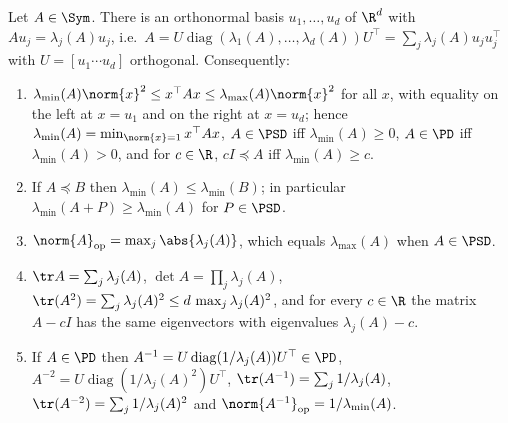\begin{lemma}\label{lem:eigen_quadratic_bounds}
Let $A \in \Sym$. There is an orthonormal basis $u_1, \dots, u_d$ of $\R^d$ with
$A u_j = \lambda_j(A) u_j$, i.e.\ $A = U \operatorname{diag}(\lambda_1(A),\dots,\lambda_d(A))
U^\top = \sum_j \lambda_j(A) u_j u_j^\top$ with $U = [u_1 \cdots u_d]$ orthogonal. Consequently:
\begin{enumerate}
  \item[(i)] $\lambda_{\min}(A)\norm{x}^2 \le x^\top A x \le \lambda_{\max}(A)\norm{x}^2$ for all
        $x$, with equality on the left at $x = u_1$ and on the right at $x = u_d$; hence
        $\lambda_{\min}(A) = \min_{\norm{x} = 1} x^\top A x$, $A \in \PSD$ iff
        $\lambda_{\min}(A) \ge 0$, $A \in \PD$ iff $\lambda_{\min}(A) > 0$, and for $c \in \R$,
        $cI \preceq A$ iff $\lambda_{\min}(A) \ge c$.
  \item[(ii)] If $A \preceq B$ then $\lambda_{\min}(A) \le \lambda_{\min}(B)$; in particular
        $\lambda_{\min}(A + P) \ge \lambda_{\min}(A)$ for $P \in \PSD$.
  \item[(iii)] $\norm{A}_{\mathrm{op}} = \max_j \abs{\lambda_j(A)}$, which equals
        $\lambda_{\max}(A)$ when $A \in \PSD$.
  \item[(iv)] $\tr A = \sum_j \lambda_j(A)$, $\det A = \prod_j \lambda_j(A)$,
        $\tr(A^2) = \sum_j \lambda_j(A)^2 \le d\,\max_j\lambda_j(A)^2$, and for every $c \in \R$
        the matrix $A - cI$ has the same eigenvectors with eigenvalues $\lambda_j(A) - c$.
  \item[(v)] If $A \in \PD$ then $A^{-1} = U \operatorname{diag}(1/\lambda_j(A)) U^\top \in \PD$,
        $A^{-2} = U\operatorname{diag}(1/\lambda_j(A)^2)U^\top$, $\tr(A^{-1}) = \sum_j 1/\lambda_j(A)$,
        $\tr(A^{-2}) = \sum_j 1/\lambda_j(A)^2$ and $\norm{A^{-1}}_{\mathrm{op}} =
        1/\lambda_{\min}(A)$.
\end{enumerate}
\end{lemma}

